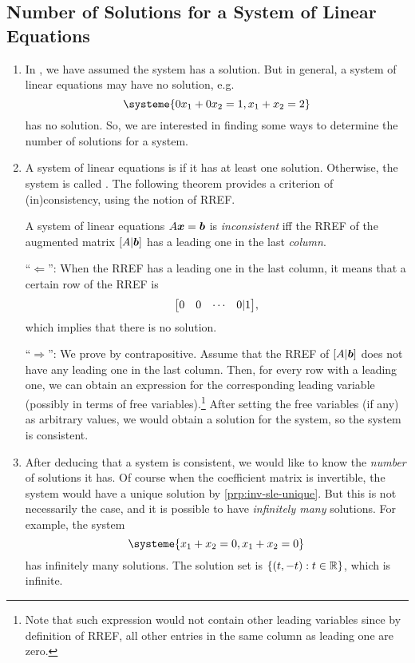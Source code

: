 \subsection{Number of Solutions for a System of Linear Equations}
\begin{enumerate}
\item In , we have assumed the system has a
solution. But in general, a system of linear equations may have no solution,
e.g.
\[
\systeme{0x_1+0x_2=1,
x_1+x_2=2}
\]
has no solution. So, we are interested in finding some ways to determine the
number of solutions for a system.

\item A system of linear equations is  if it has at least one
solution. Otherwise, the system is called . The following
theorem provides a criterion of (in)consistency, using the notion of RREF.

\begin{theorem}
\label{thm:consist-criterion}
A system of linear equations \(A\vb*{x}=\vb*{b}\) is \emph{inconsistent} iff
the RREF of the augmented matrix \([A|\vb*{b}]\) has a leading one in the last
\emph{column}.
\end{theorem}
\begin{pf}
``\(\Leftarrow\)'': When the RREF has a leading one in the last column, it
means that a certain row of the RREF is
\[
\mqty[0&0&\cdots&0|1],
\]
which implies that there is no solution.

``\(\Rightarrow\)'': We prove by contrapositive. Assume that the RREF of
\([A|\vb*{b}]\) does not have any leading one in the last column. Then, for
every row with a leading one, we can obtain an expression for the corresponding
leading variable (possibly in terms of free variables).\footnote{Note that such
expression would not contain other leading variables since by definition of
RREF, all other entries in the same column as leading one are zero.} After
setting the free variables (if any) as arbitrary values, we would obtain a
solution for the system, so the system is consistent.
\end{pf}

\item After deducing that a system is consistent, we would like to know the
\emph{number} of solutions it has. Of course when the coefficient matrix is
invertible, the system would have a unique solution by
\cref{prp:inv-sle-unique}. But this is not necessarily the case, and it is
possible to have \emph{infinitely many} solutions. For example, the system
\[
\systeme{x_1+x_2=0,
x_1+x_2=0}
\]
has infinitely many solutions. The solution set is \(\{(t,-t):t\in\mathbb{R}\}\), which
is infinite.


\end{enumerate}
